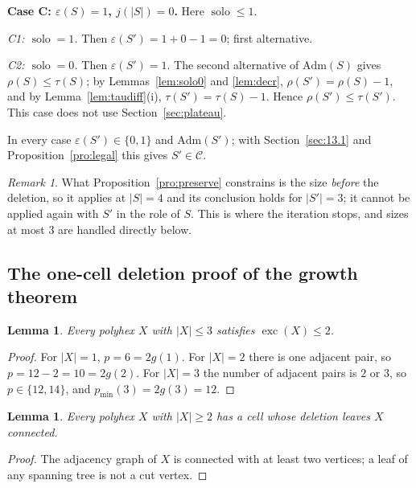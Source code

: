 \documentclass[11pt]{article}
\theoremstyle{plain}
\newtheorem{lemma}[theorem]{Lemma}
\theoremstyle{definition}
\theoremstyle{remark}
\newtheorem{remark}[theorem]{Remark}
\DeclareMathOperator{\exc}{exc}
\DeclareMathOperator{\solo}{solo}
\newcommand{\Adm}{\mathrm{Adm}}
\begin{document}
\medskip\noindent\textbf{Case C: \(\varepsilon(S)=1\), \(j(|S|)=0\).} Here \(\solo\le1\).

\emph{C1: \(\solo=1\).} Then \(\varepsilon(S')=1+0-1=0\); first alternative.

\emph{C2: \(\solo=0\).} Then \(\varepsilon(S')=1\). The second alternative of \(\Adm(S)\)
gives \(\rho(S)\le\tau(S)\); by Lemmas~\ref{lem:solo0} and \ref{lem:decr},
\(\rho(S')=\rho(S)-1\), and by Lemma~\ref{lem:taudiff}(i), \(\tau(S')=\tau(S)-1\). Hence
\(\rho(S')\le\tau(S')\). This case does not use Section~\ref{sec:plateau}.

\medskip
In every case \(\varepsilon(S')\in\{0,1\}\) and \(\Adm(S')\); with
Section~\ref{sec:13.1} and Proposition~\ref{pro:legal} this gives \(S'\in\mathcal{C}\).

\begin{remark}\label{rem:sizefour}
What Proposition~\ref{pro:preserve} constrains is the size \emph{before} the deletion, so it
applies at \(|S|=4\) and its conclusion holds for \(|S'|=3\); it cannot be applied again
with \(S'\) in the role of \(S\). This is where the iteration stops, and sizes at most
\(3\) are handled directly below.
\end{remark}

\subsection{The one-cell deletion proof of the growth theorem}\label{sec:altmain}

\begin{lemma}\label{lem:small}
Every polyhex \(X\) with \(|X|\le3\) satisfies \(\exc(X)\le2\).
\end{lemma}

\begin{proof}
For \(|X|=1\), \(p=6=2g(1)\). For \(|X|=2\) there is one adjacent pair, so
\(p=12-2=10=2g(2)\). For \(|X|=3\) the number of adjacent pairs is \(2\) or \(3\), so
\(p\in\{12,14\}\), and \(p_{\min}(3)=2g(3)=12\).
\end{proof}

\begin{lemma}\label{lem:leaf}
Every polyhex \(X\) with \(|X|\ge2\) has a cell whose deletion leaves \(X\) connected.
\end{lemma}

\begin{proof}
The adjacency graph of \(X\) is connected with at least two vertices; a leaf of any spanning
tree is not a cut vertex.
\end{proof}
\end{document}
